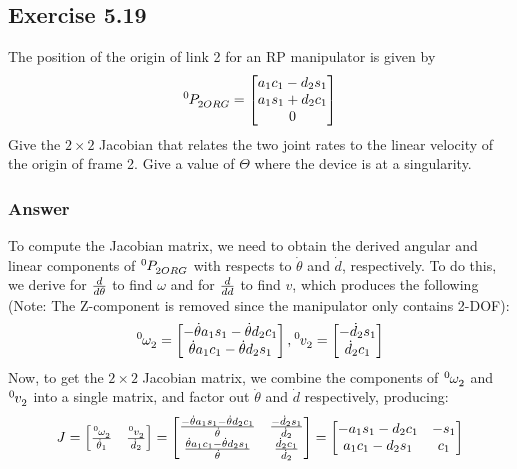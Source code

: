 \documentclass[10pt]{article}
\begin{document}
\subsection*{Exercise 5.19}
The position of the origin of link 2 for an RP manipulator is given by
\[
\tensor*[^{0}]{P}{_{2ORG}} =
\begin{bmatrix}
    a_{1}c_{1} - d_{2}s_{1}     \\
    a_{1}s_{1} + d_{2}c_{1}     \\
    0
\end{bmatrix}
\]
Give the \(2 \times 2\) Jacobian that relates the two joint rates to the linear velocity of the origin of frame {2}. Give a value of \(\Theta\) where the device is at a singularity.
\subsubsection*{Answer}
To compute the Jacobian matrix, we need to obtain the derived angular and linear components of \(\tensor*[^{0}]{P}{_{2ORG}}\) with respects to \(\dot{\theta}\) and \(\dot{d}\), respectively.  To do this, we derive for \({d}\over{d\theta}\) to find \(\omega\) and for \({d}\over{dd}\) to find \(v\), which produces the following (Note: The Z-component is removed since the manipulator only contains 2-DOF):
\[
\tensor*[^{0}]{\omega}{_{2}} =
\begin{bmatrix}
    -\dot{\theta}a_{1}s_{1} - \dot{\theta}d_{2}c_{1}     \\
    \dot{\theta}a_{1}c_{1} - \dot{\theta}d_{2}s_{1}
\end{bmatrix},
\tensor*[^{0}]{v}{_{2}} =
\begin{bmatrix}
    - \dot{d}_{2}s_{1}     \\
    \dot{d}_{2}c_{1}
\end{bmatrix}
\]
Now, to get the \(2 \times 2\) Jacobian matrix, we combine the components of \(\tensor*[^{0}]{\omega}{_{2}}\) and \(\tensor*[^{0}]{v}{_{2}}\) into a single matrix, and factor out \(\dot{\theta}\) and \(\dot{d}\) respectively, producing:
\[
J =
\begin{bmatrix}
    \tensor*[^{0}]{\omega}{_{2}}  \over {\dot{\theta}_{1}}  &
    \tensor*[^{0}]{v}{_{2}} \over \dot{d}_{2}
\end{bmatrix} =
\begin{bmatrix}
    {-\dot{\theta}a_{1}s_{1} - \dot{\theta}d_{2}c_{1}}\over{\dot{\theta}}  
    &  - \dot{d}_{2}s_{1} \over{\dot{d}_{2}}\\
    {\dot{\theta}a_{1}c_{1} - \dot{\theta}d_{2}s_{1}}\over{\dot{\theta}} 
    & \dot{d}_{2}c_{1} \over{\dot{d}_{2}}
\end{bmatrix} =
\begin{bmatrix}
    -a_{1}s_{1} - d_{2}c_{1} & -s_{1} \\
    a_{1}c_{1} - d_{2}s_{1}  & c_{1}
\end{bmatrix}
\]
\end{document}
